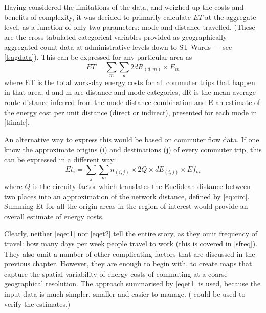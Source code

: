 \documentclass[a4paper, 11pt, twoside]{Thesis}
\begin{document}
Having considered the limitations of the data, and weighed up the
costs and benefits of complexity, it was decided to
primarily calculate $ET$ at the aggregate level,
as a function of only two parameters: mode and distance travelled.
(These are the cross-tabulated categorical variables provided as geographically
aggregated count data at administrative levels down to ST Wards ---
see \cref{t:agdata}). This can be expressed for any particular area as
\begin{equation}
 ET = \sum_m \sum_d{2dR_{(d,m)} \times E_m}
 \label{eqet1}
\end{equation}
where ET is the total work-day energy costs for all commuter trips that happen
in that area, d and m are distance and mode categories, dR is the mean average
route distance inferred from the mode-distance combination and E an
estimate of the
energy cost per unit distance (direct or indirect), presented for each mode
in \cref{tfinale}.

An alternative way to express this would be based on commuter flow data.
If one know the approximate origins (i) and destinations (j) of every commuter
trip, this can be expressed in a different way:
\begin{equation}
 Et_i = \sum_j \sum_m {n_{(i,j)} \times 2Q \times dE_{(i,j)} \times Ef_m}
 \label{eqet2}
\end{equation}
where $Q$ is the circuity factor which translates the Euclidean distance between
two places into an approximation of the network distance, defined by \cref{eq:circ}.
Summing Et for all the origin areas in the region of interest would provide
an overall estimate of energy costs.

Clearly, neither \cref{eqet1} nor \cref{eqet2}
tell the entire story, as they omit frequency of travel: how many days
per week people travel to work (this is covered in \cref{sfreq}).
They also omit a number of other complicating factors that are discussed in
the previous chapter.  However, they are enough to begin with, to create maps
that capture the spatial variability of energy costs of commuting at
a coarse geographical resolution.
The approach summarised by \cref{eqet1} is used, because the input data
is much simpler, smaller and easier to manage. ( could be used
to verify the estimates.)
\end{document}
